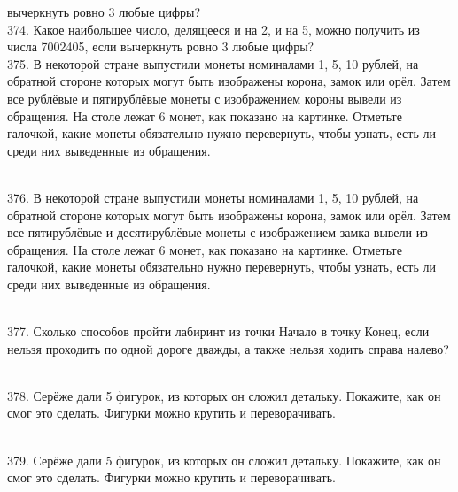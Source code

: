 вычеркнуть ровно 3 любые цифры?\\
374. Какое наибольшее число, делящееся и на 2, и на 5, можно получить из числа 7002405, если
вычеркнуть ровно 3 любые цифры?\\
375. В некоторой стране выпустили монеты номиналами 1, 5, 10 рублей, на обратной стороне которых
могут быть изображены корона, замок или орёл. Затем все рублёвые и пятирублёвые монеты с
изображением короны вывели из обращения. На столе лежат 6 монет, как показано на картинке.
Отметьте галочкой, какие монеты обязательно нужно перевернуть, чтобы узнать, есть ли среди них
выведенные из обращения.\\
\begin{figure}[ht!]
\end{figure}\\
376. В некоторой стране выпустили монеты номиналами 1, 5, 10 рублей, на обратной стороне которых
могут быть изображены корона, замок или орёл. Затем все пятирублёвые и десятирублёвые монеты
с изображением замка вывели из обращения. На столе лежат 6 монет, как показано на картинке.
Отметьте галочкой, какие монеты обязательно нужно перевернуть, чтобы узнать, есть ли среди них
выведенные из обращения.\\
\begin{figure}[ht!]
\end{figure}\\
377. Сколько способов пройти лабиринт из точки Начало в точку Конец, если нельзя проходить по одной дороге
дважды, а также нельзя ходить справа налево?\\
\begin{figure}[ht!]
\end{figure}\\
378. Серёже дали 5 фигурок, из которых он сложил детальку. Покажите, как он смог это сделать.
Фигурки можно крутить и переворачивать.\\
\begin{figure}[ht!]
\end{figure}\\
379. Серёже дали 5 фигурок, из которых он сложил детальку. Покажите, как он смог это сделать.
Фигурки можно крутить и переворачивать.\\
\begin{figure}[ht!]
\end{figure}\\

